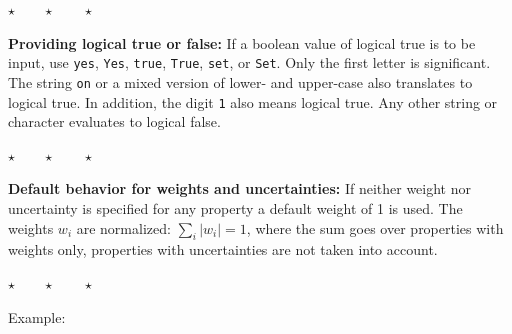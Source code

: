 \documentclass[a4paper,12pt,pdftex,onecolumn]{article}
\newcommand{\stars}{\begin{center}%
\vspace{1em plus 0.5em minus 0.5em}%
$\star \qquad \star \qquad \star$%
\vspace{1em plus 0.5em minus 0.5em}%
\end{center}}
\begin{document}
\stars

\textbf{Providing logical true or false:}
If a boolean value of logical true is to be input, use
\verb+yes+, \verb+Yes+, \verb+true+, \verb+True+, \verb+set+, or \verb+Set+.
Only the first letter is significant. The string \verb+on+
or a mixed version of lower- and upper-case also translates to logical true.
In addition, the digit \verb+1+ also means logical true.
Any other string or character evaluates to logical false.

\stars

\textbf{Default behavior for weights and uncertainties:}
If neither weight nor uncertainty is specified for any property a default weight of 1
is used. The weights $w_i$ are normalized: $\sum_i |w_i| = 1$, where the sum goes over
properties with weights only, properties with uncertainties are not taken into account.


\stars

Example:
\end{document}
